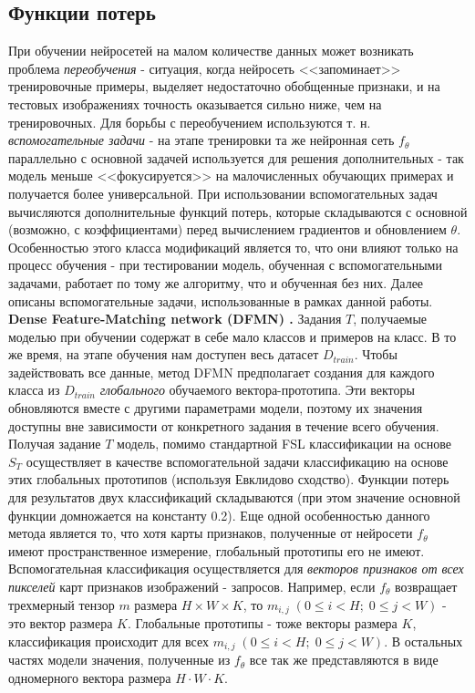 \documentclass[a4paper, 12pt]{report}
\begin{document}
\subsection{Функции потерь}
При обучении нейросетей на малом количестве данных может возникать проблема \textit{переобучения} - ситуация, когда нейросеть <<запоминает>> тренировочные примеры, выделяет недостаточно обобщенные признаки, и на тестовых изображениях точность оказывается сильно ниже, чем на тренировочных. Для борьбы с переобучением используются т. н. \textit{вспомогательные задачи} - на этапе тренировки та же нейронная сеть $f_{\theta}$ параллельно с основной задачей используется для решения дополнительных - так модель меньше <<фокусируется>> на малочисленных обучающих примерах и получается более универсальной. При использовании вспомогательных задач вычисляются дополнительные функций потерь, которые складываются с основной (возможно, с коэффициентами) перед вычислением градиентов и обновлением $\theta$. Особенностью этого класса модификаций является то, что они влияют только на процесс обучения - при тестировании модель, обученная с вспомогательными задачами, работает по тому же алгоритму, что и обученная без них. Далее описаны вспомогательные задачи, использованные в рамках данной работы. \\

\textbf {Dense Feature-Matching network (DFMN) \cite{dfmn}.} Задания $T$, получаемые моделью при обучении содержат в себе мало классов и примеров на класс. В то же время, на этапе обучения нам доступен весь датасет $D_{train}$. Чтобы задействовать все данные, метод DFMN предполагает создания для каждого класса из $D_{train}$ \textit{глобального} обучаемого вектора-прототипа. Эти векторы обновляются вместе с другими параметрами модели, поэтому их значения доступны вне зависимости от конкретного задания в течение всего обучения. Получая задание $T$ модель, помимо стандартной FSL классификации на основе $S_{T}$ осуществляет в качестве вспомогательной задачи классификацию на основе этих глобальных прототипов (используя Евклидово сходство). Функции потерь для результатов двух классификаций складываются (при этом значение основной функции домножается на константу 0.2).  Еще одной особенностью данного метода является то, что хотя карты признаков, полученные от нейросети $f_{\theta}$ имеют пространственное измерение, глобальный прототипы его не имеют. Вспомогательная классификация осуществляется для \textit{векторов признаков от всех пикселей} карт признаков изображений - запросов. Например, если $f_{\theta}$ возвращает трехмерный тензор $m$ размера $H \times W \times K$, то $m_{i, j} \; (0 \le i < H; \; 0 \le j < W)$ - это вектор размера $K$. Глобальные прототипы - тоже векторы размера $K$, классификация происходит для всех $m_{i, j} \; (0 \le i < H; \; 0 \le j < W)$. В остальных частях модели значения, полученные из $f_{\theta}$ все так же представляются в виде одномерного вектора размера $H \cdot W \cdot K$. \\
\end{document}
